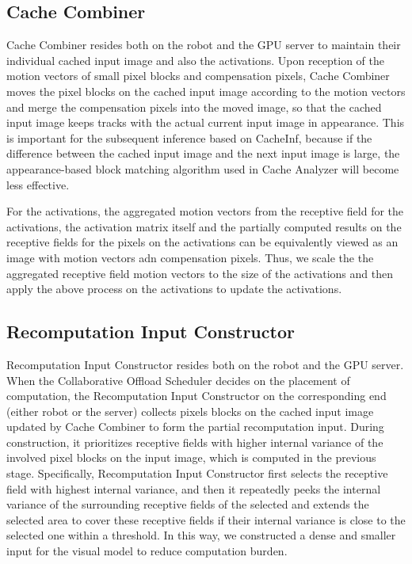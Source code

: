 \subsection{Cache Combiner}
Cache Combiner resides both on the robot and the GPU server to maintain their individual cached input image and also the activations.
Upon reception of the motion vectors of small pixel blocks and compensation pixels, Cache Combiner moves the pixel blocks on the cached input image according to the motion vectors and merge the compensation pixels into the moved image, so that the cached input image keeps tracks with the actual current input image in appearance.
This is important for the subsequent inference based on CacheInf, because if the difference between the cached input image and the next input image is large, the appearance-based block matching algorithm used in Cache Analyzer will become less effective.

For the activations, the aggregated motion vectors from the receptive field for the activations, the activation matrix itself and the partially computed results on the receptive fields for the pixels on the activations can be equivalently viewed as an image with motion vectors adn compensation pixels.
Thus, we scale the the aggregated receptive field motion vectors to the size of the activations and then apply the above process on the activations to update the activations.

\subsection{Recomputation Input Constructor}
Recomputation Input Constructor resides both on the robot and the GPU server.
When the Collaborative Offload Scheduler decides on the placement of computation, the Recomputation Input Constructor on the corresponding end (either robot or the server) collects pixels blocks on the cached input image updated by Cache Combiner to form the partial recomputation input.
During construction, it prioritizes receptive fields with higher internal variance of the involved pixel blocks on the input image, which is computed in the previous stage.
Specifically, Recomputation Input Constructor first selects the receptive field with highest internal variance, and then it repeatedly peeks the internal variance of the surrounding receptive fields of the selected and extends the selected area to cover these receptive fields if their internal variance is close to the selected one within a threshold.
In this way, we constructed a dense and smaller input for the visual model to reduce computation burden.


